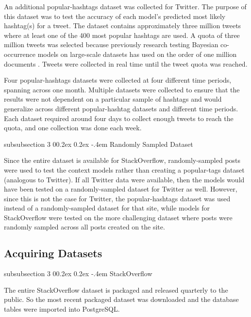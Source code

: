 \documentclass[man,donotrepeattitle]{apa6}
\makeatletter
\renewcommand{\subsubsection}{%
  \@startsection
  {subsubsection}%
  {3}%
  {\parindent}%
  {0\baselineskip \@plus 0.2ex \@minus 0.2ex}%
  {-.4em}%
  {\normalfont\normalsize\bfseries\addperi}}
\makeatother
\begin{document}
An additional popular-hashtags dataset was collected for Twitter.
The purpose of this dataset was to test the accuracy of each model's predicted most likely hashtag(s) for a tweet.
The dataset contains approximately three million tweets where at least one of the 400 most popular hashtags are used.
A quota of three million tweets was selected because previously research testing Bayesian co-occurrence models on large-scale datasets has used on the order of one million documents
\parencites{Stanley2013,Douglass2010,Budiu2007}.
Tweets were collected in real time until the tweet quota was reached.

Four popular-hashtags datasets were collected at four different time periods, spanning across one month.
Multiple datasets were collected to ensure that the results were not dependent on a particular sample of hashtags and would generalize across different popular-hashtag datasets and different time periods.
Each dataset required around four days to collect enough tweets to reach the quota, and one collection was done each week.

\subsubsection{Randomly Sampled Dataset}

Since the entire dataset is available for StackOverflow, randomly-sampled posts were used to test the context models rather than creating a popular-tags dataset (analogous to Twitter).
If all Twitter data were available, then the models would have been tested on a randomly-sampled dataset for Twitter as well.
However, since this is not the case for Twitter, the popular-hashtags dataset was used instead of a randomly-sampled dataset for that site,
while models for StackOverflow were tested on the more challenging dataset where posts were randomly sampled across all posts created on the site.

\subsection{Acquiring Datasets}

\subsubsection{StackOverflow}

The entire StackOverflow dataset is packaged and released quarterly to the public.
So the most recent packaged dataset was downloaded and the database tables were imported into PostgreSQL.
\end{document}
